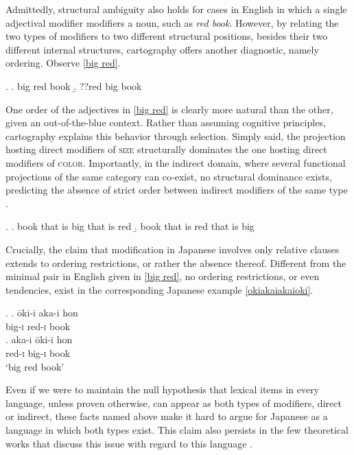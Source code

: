 \documentclass [output=book,colorlinks,citecolor=brown]{langscibook}
\begin{document}
Admittedly, structural ambiguity also holds for cases in English in which a single adjectival modifier modifiers a noun, such as \textit{red book}. However, by relating the two types of modifiers to two different structural positions, besides their two different internal structures, cartography offers another diagnostic, namely ordering. Observe \ref{big red}. %

\ex. \label{big red} \a. big red book
\b. ??red big book

One order of the adjectives in \ref{big red} is clearly more natural than the other, given an out-of-the-blue context. Rather than assuming cognitive principles, cartography explains this behavior through selection. Simply said, the projection hosting direct modifiers of \textsc{size} structurally dominates the one hosting direct modifiers of \textsc{color}. Importantly, in the indirect domain, where several functional projections of the same category can co-exist, no structural dominance exists, predicting the absence of strict order between indirect modifiers of the same type \citep{sproat:1991:the, baker:2003:verbal}.

\ex. \a. book that is big that is red
\b. book that is red that is big

Crucially, the claim that modification in Japanese involves only relative clauses extends to ordering restrictions, or rather the absence thereof. Different from the minimal pair in English given in \ref{big red}, no ordering restrictions, or even tendencies, exist in the corresponding Japanese example \ref{okiakaiakaioki}.

\ex. \label{okiakaiakaioki} \ag. ōki-i aka-i hon\\
big-\textsc{i} red-\textsc{i} book\\
\bg. aka-i ōki-i hon\\
red-\textsc{i} big-\textsc{i} book\\
`big red book’

Even if we were to maintain the null hypothesis that lexical items in every language, unless proven otherwise, can appear as both types of modifiers, direct or indirect, these facts named above make it hard to argue for Japanese as a language in which both types exist. This claim also persists in the few theoretical works that discuss this issue with regard to this language \citep{sproat:1991:the, baker:2003:verbal, laenzlinger:2011:elements}.
\end{document}
